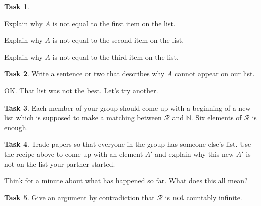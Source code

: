 \documentclass[12pt]{amsart}
\theoremstyle{definition}
\newtheorem{task}{Task}
\begin{document}
\begin{task}
\begin{compactitem}
\item Explain why $A$ is not equal to the first item on the list.
\item Explain why $A$ is not equal to the second item on the list.
\item Explain why $A$ is not equal to the third item on the list.
\end{compactitem}
\end{task}


\begin{task}
Write a sentence or two that describes why $A$ cannot appear on our list.
\end{task}

OK. That list was not the best. Let's try another.

\begin{task}
Each member of your group should come up with a beginning of a new list which is supposed to make a matching between $\mathcal{R}$ and $\mathbb{N}$.
Six elements of $\mathcal{R}$ is enough.
\end{task}

\begin{task}
Trade papers so that everyone in the group has someone else's list.
Use the recipe above to come up with an element $A'$ and explain why this new $A'$ is not on the list your partner started.
\end{task}

Think for a minute about what has happened so far.
What does this all mean?

\begin{task}
Give an argument by contradiction that $\mathcal{R}$ is \textbf{not} countably infinite.
\end{task}
\end{document}
